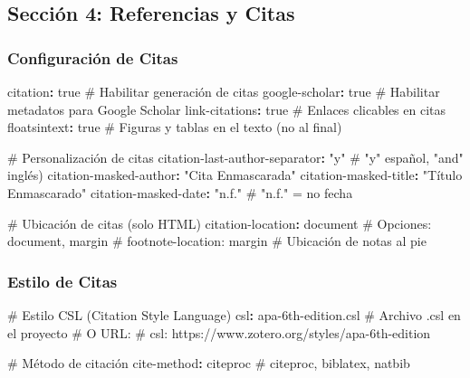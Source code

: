 \documentclass[
  doc,
  floatsintext,
  longtable,
  a4paper,
  nolmodern,
  notxfonts,
  notimes,
  12pt,
  colorlinks=true,linkcolor=blue,citecolor=blue,urlcolor=blue]{apa7}
\newenvironment{Shaded}{\begin{snugshade}}{\end{snugshade}}
\newcommand{\AttributeTok}[1]{\textcolor[rgb]{0.40,0.45,0.13}{#1}}
\newcommand{\CharTok}[1]{\textcolor[rgb]{0.13,0.47,0.30}{#1}}
\newcommand{\CommentTok}[1]{\textcolor[rgb]{0.37,0.37,0.37}{#1}}
\newcommand{\FunctionTok}[1]{\textcolor[rgb]{0.28,0.35,0.67}{#1}}
\newcommand{\KeywordTok}[1]{\textcolor[rgb]{0.00,0.23,0.31}{\textbf{#1}}}
\newcommand{\StringTok}[1]{\textcolor[rgb]{0.13,0.47,0.30}{#1}}
\begin{document}
\subsection{Sección 4: Referencias y
Citas}\label{secciuxf3n-4-referencias-y-citas}

\subsubsection{Configuración de Citas}\label{configuraciuxf3n-de-citas}

\begin{Shaded}
\begin{Highlighting}[]
\FunctionTok{citation}\KeywordTok{:}\AttributeTok{ }\CharTok{true}\CommentTok{          \# Habilitar generación de citas}
\FunctionTok{google{-}scholar}\KeywordTok{:}\AttributeTok{ }\CharTok{true}\CommentTok{    \# Habilitar metadatos para Google Scholar}
\FunctionTok{link{-}citations}\KeywordTok{:}\AttributeTok{ }\CharTok{true}\CommentTok{    \# Enlaces clicables en citas}
\FunctionTok{floatsintext}\KeywordTok{:}\AttributeTok{ }\CharTok{true}\CommentTok{      \# Figuras y tablas en el texto (no al final)}

\CommentTok{\# Personalización de citas}
\FunctionTok{citation{-}last{-}author{-}separator}\KeywordTok{:}\AttributeTok{ }\StringTok{"y"}\CommentTok{      \# "y" español, "and" inglés)}
\FunctionTok{citation{-}masked{-}author}\KeywordTok{:}\AttributeTok{ }\StringTok{"Cita Enmascarada"}
\FunctionTok{citation{-}masked{-}title}\KeywordTok{:}\AttributeTok{ }\StringTok{"Título Enmascarado"}
\FunctionTok{citation{-}masked{-}date}\KeywordTok{:}\AttributeTok{ }\StringTok{"n.f."}\CommentTok{              \# "n.f." = no fecha}

\CommentTok{\# Ubicación de citas (solo HTML)}
\FunctionTok{citation{-}location}\KeywordTok{:}\AttributeTok{ document}\CommentTok{               \# Opciones: document, margin}
\CommentTok{\# footnote{-}location: margin               \# Ubicación de notas al pie}
\end{Highlighting}
\end{Shaded}

\subsubsection{Estilo de Citas}\label{estilo-de-citas}

\begin{Shaded}
\begin{Highlighting}[]
\CommentTok{\# Estilo CSL (Citation Style Language)}
\FunctionTok{csl}\KeywordTok{:}\AttributeTok{ apa{-}6th{-}edition.csl}\CommentTok{                 \# Archivo .csl en el proyecto}
\CommentTok{\# O URL:}
\CommentTok{\# csl: https://www.zotero.org/styles/apa{-}6th{-}edition}

\CommentTok{\# Método de citación}
\FunctionTok{cite{-}method}\KeywordTok{:}\AttributeTok{ citeproc}\CommentTok{                     \# citeproc, biblatex, natbib}
\end{Highlighting}
\end{Shaded}
\end{document}
